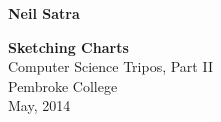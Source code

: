\begin{titlepage}

\hfill{\LARGE \bf Neil Satra}

\vspace*{\fill}

\begin{center}
\begin{doublespacing}


\Huge {\bf Sketching Charts} \\
Computer Science Tripos, Part II \\
Pembroke College \\
May, 2014

\end{doublespacing}
\end{center}

\vspace*{\fill}
\end{titlepage}